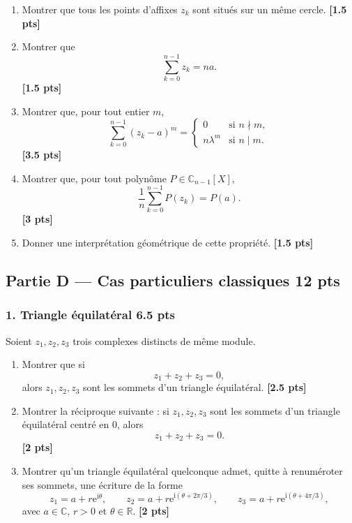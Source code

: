 \documentclass[11pt,a4paper]{article}
\newcommand{\C}{\mathbb{C}}
\newcommand{\R}{\mathbb{R}}
\newcommand{\ii}{\mathrm{i}}
\newcommand{\e}{\mathrm{e}}
\newcommand{\bareme}[1]{\hfill{\small\textbf{[#1 pts]}}}
\begin{document}
\begin{enumerate}[label=\textbf{C.\arabic*.}]
    \item Montrer que tous les points d'affixes \(z_k\) sont situés sur un même cercle.
    \bareme{1.5}

    \item Montrer que
    \[
    \sum_{k=0}^{n-1} z_k=na.
    \]
    \bareme{1.5}

    \item Montrer que, pour tout entier \(m\),
    \[
    \sum_{k=0}^{n-1}(z_k-a)^m=
    \begin{cases}
    0 & \text{si } n\nmid m,\\[0.4em]
    n\lambda^m & \text{si } n\mid m.
    \end{cases}
    \]
    \bareme{3.5}

    \item Montrer que, pour tout polynôme \(P\in\C_{n-1}[X]\),
    \[
    \frac1n\sum_{k=0}^{n-1}P(z_k)=P(a).
    \]
    \bareme{3}

    \item Donner une interprétation géométrique de cette propriété.
    \bareme{1.5}
\end{enumerate}

\subsection*{Partie D --- Cas particuliers classiques \hfill \textbf{12 pts}}

\subsubsection*{1. Triangle équilatéral \hfill \textbf{6.5 pts}}

Soient \(z_1,z_2,z_3\) trois complexes distincts de même module.

\begin{enumerate}[label=\textbf{D1.\arabic*.}]
    \item Montrer que si
    \[
    z_1+z_2+z_3=0,
    \]
    alors \(z_1,z_2,z_3\) sont les sommets d'un triangle équilatéral.
    \bareme{2.5}

    \item Montrer la réciproque suivante : si \(z_1,z_2,z_3\) sont les sommets d'un triangle équilatéral centré en \(0\), alors
    \[
    z_1+z_2+z_3=0.
    \]
    \bareme{2}

    \item Montrer qu'un triangle équilatéral quelconque admet, quitte à renuméroter ses sommets, une écriture de la forme
    \[
    z_1=a+r\e^{\ii\theta},\qquad
    z_2=a+r\e^{\ii(\theta+2\pi/3)},\qquad
    z_3=a+r\e^{\ii(\theta+4\pi/3)},
    \]
    avec \(a\in\C\), \(r>0\) et \(\theta\in\R\).
    \bareme{2}
\end{enumerate}
\end{document}
